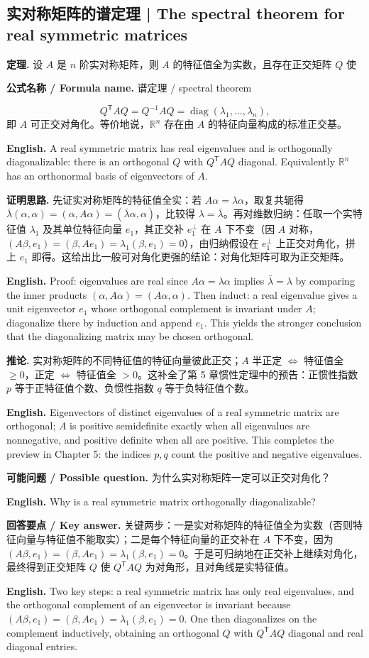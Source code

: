 \documentclass[UTF8,11pt,a4paper]{ctexart}
\newcommand{\EN}[1]{\par\noindent\textbf{English.} #1\par}
\newcommand{\FORMULA}[2]{\par\noindent\textbf{公式名称 / Formula name.} #1 / #2\par}
\newcommand{\ASK}[4]{\par\noindent\textbf{可能问题 / Possible question.} #1\par\EN{#2}\noindent\textbf{回答要点 / Key answer.} #3\par\EN{#4}\medskip}
\begin{document}
\subsection{实对称矩阵的谱定理 | The spectral theorem for real symmetric matrices}
\noindent\textbf{定理.} 设 $A$ 是 $n$ 阶实对称矩阵，则 $A$ 的特征值全为实数，且存在正交矩阵 $Q$ 使
\FORMULA{谱定理}{spectral theorem}
\[
Q^{\mathsf T}AQ=Q^{-1}AQ=\operatorname{diag}(\lambda_1,\dots,\lambda_n),
\]
即 $A$ 可正交对角化。等价地说，$\mathbb R^n$ 存在由 $A$ 的特征向量构成的标准正交基。
\EN{A real symmetric matrix has real eigenvalues and is orthogonally diagonalizable: there is an orthogonal $Q$ with $Q^{\mathsf T}AQ$ diagonal. Equivalently $\mathbb R^n$ has an orthonormal basis of eigenvectors of $A$.}
\noindent\textbf{证明思路.} 先证实对称矩阵的特征值全实：若 $A\alpha=\lambda\alpha$，取复共轭得 $\bar\lambda(\alpha,\alpha)=(\alpha,A\alpha)=(\bar\lambda\alpha,\alpha)$，比较得 $\lambda=\bar\lambda$。再对维数归纳：任取一个实特征值 $\lambda_1$ 及其单位特征向量 $e_1$，其正交补 $e_1^\perp$ 在 $A$ 下不变（因 $A$ 对称，$(A\beta,e_1)=(\beta,Ae_1)=\lambda_1(\beta,e_1)=0$），由归纳假设在 $e_1^\perp$ 上正交对角化，拼上 $e_1$ 即得。这给出比一般可对角化更强的结论：对角化矩阵可取为正交矩阵。
\EN{Proof: eigenvalues are real since $A\alpha=\lambda\alpha$ implies $\bar\lambda=\lambda$ by comparing the inner products $(\alpha,A\alpha)=(A\alpha,\alpha)$. Then induct: a real eigenvalue gives a unit eigenvector $e_1$ whose orthogonal complement is invariant under $A$; diagonalize there by induction and append $e_1$. This yields the stronger conclusion that the diagonalizing matrix may be chosen orthogonal.}
\noindent\textbf{推论.} 实对称矩阵的不同特征值的特征向量彼此正交；$A$ 半正定 $\iff$ 特征值全 $\ge0$，正定 $\iff$ 特征值全 $>0$。这补全了第 5 章惯性定理中的预告：正惯性指数 $p$ 等于正特征值个数、负惯性指数 $q$ 等于负特征值个数。
\EN{Eigenvectors of distinct eigenvalues of a real symmetric matrix are orthogonal; $A$ is positive semidefinite exactly when all eigenvalues are nonnegative, and positive definite when all are positive. This completes the preview in Chapter 5: the indices $p,q$ count the positive and negative eigenvalues.}
\ASK{为什么实对称矩阵一定可以正交对角化？}{Why is a real symmetric matrix orthogonally diagonalizable?}{关键两步：一是实对称矩阵的特征值全为实数（否则特征向量与特征值不能取实）；二是每个特征向量的正交补在 $A$ 下不变，因为 $(A\beta,e_1)=(\beta,Ae_1)=\lambda_1(\beta,e_1)=0$。于是可归纳地在正交补上继续对角化，最终得到正交矩阵 $Q$ 使 $Q^{\mathsf T}AQ$ 为对角形，且对角线是实特征值。}{Two key steps: a real symmetric matrix has only real eigenvalues, and the orthogonal complement of an eigenvector is invariant because $(A\beta,e_1)=(\beta,Ae_1)=\lambda_1(\beta,e_1)=0$. One then diagonalizes on the complement inductively, obtaining an orthogonal $Q$ with $Q^{\mathsf T}AQ$ diagonal and real diagonal entries.}
\end{document}
